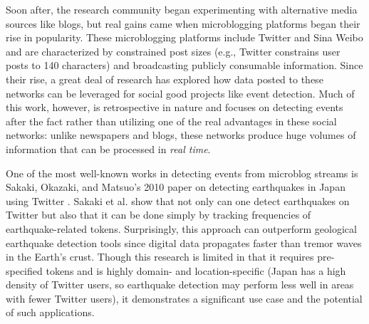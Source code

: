 \documentclass{sig-alternate}
\begin{document}


Soon after, the research community began experimenting with alternative media sources like blogs, but real gains came when microblogging platforms began their rise in popularity.
These microblogging platforms include Twitter and Sina Weibo and are characterized by constrained post sizes (e.g., Twitter constrains user posts to 140 characters) and broadcasting publicly consumable information.
Since their rise, a great deal of research has explored how data posted to these networks can be leveraged for social good projects like event detection.
Much of this work, however, is retrospective in nature and focuses on detecting events after the fact rather than utilizing one of the real advantages in these social networks: unlike newspapers and blogs, these networks produce huge volumes of information that can be processed in \emph{real time}.

One of the most well-known works in detecting events from microblog streams is Sakaki, Okazaki, and Matsuo's 2010 paper on detecting earthquakes in Japan using Twitter \cite{Sakaki:2010:EST:1772690.1772777}.
Sakaki et al. show that not only can one detect earthquakes on Twitter but also that it can be done simply by tracking frequencies of earthquake-related tokens.
Surprisingly, this approach can outperform geological earthquake detection tools since digital data propagates faster than tremor waves in the Earth's crust.
Though this research is limited in that it requires pre-specified tokens and is highly domain- and location-specific (Japan has a high density of Twitter users, so earthquake detection may perform less well in areas with fewer Twitter users), it demonstrates a significant use case and the potential of such applications.
\end{document}
